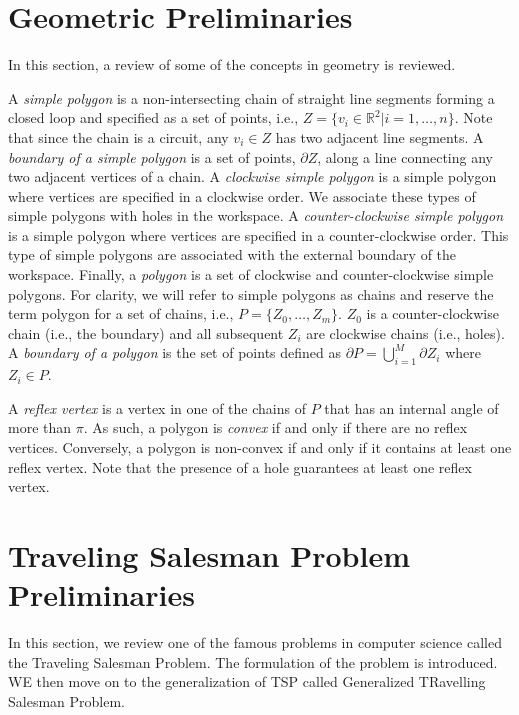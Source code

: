 \documentclass[../main.tex]{subfiles}
\begin{document}
\section{Geometric Preliminaries}
\label{section:background_geometry}

In this section, a review of some of the concepts in geometry is reviewed.

A \emph{simple polygon} is a non-intersecting chain of straight line segments forming a closed loop and specified as a set of points, i.e., $Z=\{v_i\in\mathbb{R}^2|i=1,\ldots,n\}$. Note that since the chain is a circuit, any $v_i\in Z$ has two adjacent line segments. A \emph{boundary of a simple polygon} is a set of points, $\partial Z$, along a line connecting any two adjacent vertices of a chain. A \emph{clockwise simple polygon} is a simple polygon where vertices are specified in a clockwise order. We associate these types of simple polygons with holes in the workspace. A \emph{counter-clockwise simple polygon} is a simple polygon where vertices are specified in a counter-clockwise order. This type of simple polygons are associated with the external boundary of the workspace. Finally, a \emph{polygon} is a set of clockwise and counter-clockwise simple polygons. For clarity, we will refer to simple polygons as chains and reserve the term polygon for a set of chains, i.e., $P=\{Z_0,\ldots,Z_m\}$. $Z_0$ is a counter-clockwise chain (i.e., the boundary) and all subsequent $Z_i$ are clockwise chains (i.e., holes). A \emph{boundary of a polygon} is the set of points defined as $\partial P=\bigcup^M_{i=1}\partial Z_i$ where $Z_i\in P$.

A \emph{reflex vertex} is a vertex in one of the chains of $P$ that has an internal angle of more than $\pi$. As such, a polygon is \emph{convex} if and only if there are no reflex vertices. Conversely, a polygon is non-convex if and only if it contains at least one reflex vertex. Note that the presence of a hole guarantees at least one reflex vertex.

\section{Traveling Salesman Problem Preliminaries}
\label{section:GTSP}

In this section, we review one of the famous problems in computer science called the Traveling Salesman Problem. The formulation of the problem is introduced. WE then move on to the generalization of TSP called Generalized TRavelling Salesman Problem.
\end{document}
